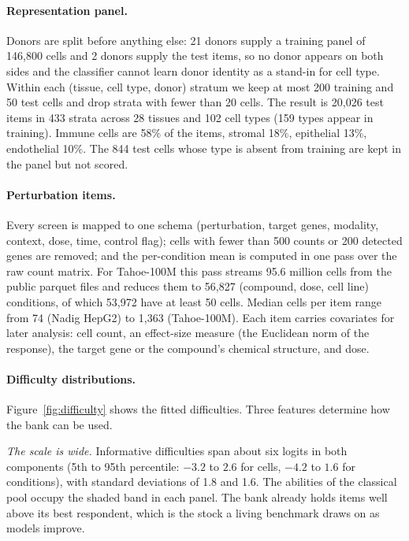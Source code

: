 \documentclass[11pt]{article}
\begin{document}
\paragraph{Representation panel.}
Donors are split before anything else: 21 donors supply a training panel of 146,800
cells and 2 donors supply the test items, so no donor appears on both sides and the
classifier cannot learn donor identity as a stand-in for cell type. Within each
(tissue, cell type, donor) stratum we keep at most 200 training and 50 test cells and
drop strata with fewer than 20 cells. The result is 20,026 test items in 433 strata
across 28 tissues and 102 cell types (159 types appear in training). Immune cells are
58\% of the items, stromal 18\%, epithelial 13\%, endothelial 10\%. The 844 test cells
whose type is absent from training are kept in the panel but not scored.

\paragraph{Perturbation items.}
Every screen is mapped to one schema (perturbation, target genes, modality, context,
dose, time, control flag); cells with fewer than 500 counts or 200 detected genes are
removed; and the per-condition mean is computed in one pass over the raw count
matrix. For Tahoe-100M this pass streams 95.6 million cells from the public parquet
files and reduces them to 56,827 (compound, dose, cell line) conditions, of which
53,972 have at least 50 cells. Median cells per item range from 74 (Nadig HepG2) to
1,363 (Tahoe-100M). Each item carries covariates for later analysis: cell count, an
effect-size measure (the Euclidean norm of the response), the target gene or the
compound's chemical structure, and dose.

\paragraph{Difficulty distributions.}
Figure~\ref{fig:difficulty} shows the fitted difficulties. Three features determine
how the bank can be used.

\emph{The scale is wide.} Informative difficulties span about six logits in both
components (5th to 95th percentile: $-3.2$ to $2.6$ for cells, $-4.2$ to $1.6$ for
conditions), with standard deviations of 1.8 and 1.6. The abilities of the classical
pool occupy the shaded band in each panel. The bank already holds items well above
its best respondent, which is the stock a living benchmark draws on as models
improve.
\end{document}
